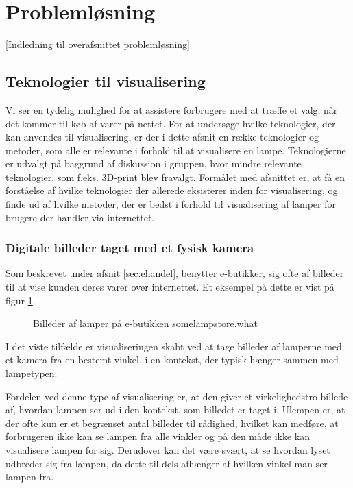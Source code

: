 \section{Problemløsning}

[Indledning til overafsnittet problemløsning]

\subsection{Teknologier til visualisering}
\label{sec:teknologianalyse}
Vi ser en tydelig mulighed for at assistere forbrugere med at træffe et valg, når det kommer til køb af varer på nettet. For at undersøge hvilke teknologier, der kan anvendes til visualisering, er der i dette afsnit en række teknologier og metoder, som alle er relevante i forhold til at visualisere en lampe. Teknologierne er udvalgt på baggrund af diskussion i gruppen, hvor mindre relevante teknologier, som f.eks. 3D-print blev fravalgt. Formålet med afsnittet er, at få en forståelse af hvilke teknologier der allerede eksisterer inden for visualisering, og finde ud af hvilke metoder, der er bedst i forhold til visualisering af lamper for brugere der handler via internettet.

\subsubsection{Digitale billeder taget med et fysisk kamera}
Som beskrevet under afsnit \ref{sec:ehandel}, benytter e-butikker, sig ofte af billeder til at vise kunden deres varer over internettet. Et eksempel på dette er vist på figur \ref{fig:e_handel_lampebilleder}.

\begin{figure}[H]
    \centering
    \fbox{\rule{\textwidth}{5cm}}
    \caption{Billeder af lamper på e-butikken somelampstore.what}
    \label{fig:e_handel_lampebilleder}
\end{figure} 

I det viste tilfælde er visualiseringen skabt ved at tage billeder af lamperne med et kamera fra en bestemt vinkel, i en kontekst, der typisk hænger sammen med lampetypen. 

Fordelen ved denne type af visualisering er, at den giver et virkelighedstro billede af, hvordan lampen ser ud i den kontekst, som billedet er taget i. \newline Ulempen er, at der ofte kun er et begrænset antal billeder til rådighed, hvilket kan medføre, at forbrugeren ikke kan se lampen fra alle vinkler og på den måde ikke kan visualisere lampen for sig. Derudover kan det være svært, at se hvordan lyset udbreder sig fra lampen, da dette til dels afhænger af hvilken vinkel man ser lampen fra. 

